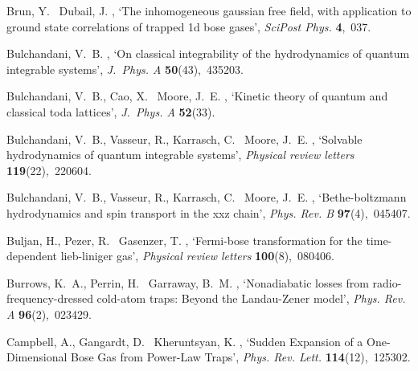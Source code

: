 \documentclass[onecolumn,amsfonts,showpacs,superscriptaddress]{revtex4-1}
\begin{document}
\begin{thebibliography}{xx}
Brun, Y. \harvardand\ Dubail, J.  \harvardyearright , `The
  inhomogeneous gaussian free field, with application to ground state
  correlations of trapped 1d bose gases', {\em SciPost Phys.} {\bf 4},~037.

Bulchandani, V.~B.  \harvardyearright , `On classical
  integrability of the hydrodynamics of quantum integrable systems', {\em
  J.~Phys. A} {\bf 50}(43),~435203.

Bulchandani, V.~B., Cao, X. \harvardand\ Moore, J.~E.  \harvardyearleft
  2019\harvardyearright , `Kinetic theory of quantum and classical toda
  lattices', {\em J.~Phys. A} {\bf 52}(33).

Bulchandani, V.~B., Vasseur, R., Karrasch, C. \harvardand\ Moore, J.~E.
  \harvardyearleft 2017\harvardyearright , `Solvable hydrodynamics of quantum
  integrable systems', {\em Physical review letters} {\bf 119}(22),~220604.

Bulchandani, V.~B., Vasseur, R., Karrasch, C. \harvardand\ Moore, J.~E.
  \harvardyearleft 2018\harvardyearright , `Bethe-boltzmann hydrodynamics and
  spin transport in the xxz chain', {\em Phys. Rev. B} {\bf 97}(4),~045407.

Buljan, H., Pezer, R. \harvardand\ Gasenzer, T.  \harvardyearright , `Fermi-bose transformation for the time-dependent
  lieb-liniger gas', {\em Physical review letters} {\bf 100}(8),~080406.

Burrows, K.~A., Perrin, H. \harvardand\ Garraway, B.~M.  \harvardyearleft
  2017\harvardyearright , `Nonadiabatic losses from radio-frequency-dressed
  cold-atom traps: {Beyond} the {Landau}-{Zener} model', {\em Phys. Rev. A}
  {\bf 96}(2),~023429.

Campbell, A., Gangardt, D. \harvardand\ Kheruntsyan, K.  \harvardyearleft
  2015\harvardyearright , `Sudden {Expansion} of a {One}-{Dimensional} {Bose}
  {Gas} from {Power}-{Law} {Traps}', {\em Phys. Rev. Lett.} {\bf
  114}(12),~125302.


\end{thebibliography}
\end{document}
